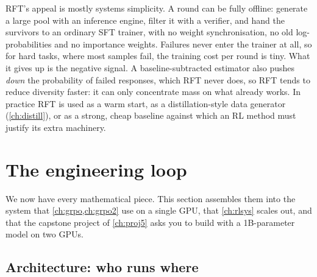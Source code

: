 RFT's appeal is mostly systems simplicity. A round can be fully offline: generate a large
pool with an inference engine, filter it with a verifier, and hand the survivors to an
ordinary SFT trainer, with no weight synchronisation, no old log-probabilities and no
importance weights. Failures never enter the trainer at all, so for hard tasks, where most
samples fail, the training cost per round is tiny. What it gives up is the negative signal.
A baseline-subtracted estimator also pushes \emph{down} the probability of failed responses,
which RFT never does, so RFT tends to reduce diversity faster: it can only concentrate mass on
what already works. In practice RFT is used as a warm start, as a distillation-style data
generator (\cref{ch:distill}), or as a strong, cheap baseline against which an RL method must
justify its extra machinery.

\section{The engineering loop}\label{sec:pg:loop}

We now have every mathematical piece. This section assembles them into the system that
\cref{ch:grpo,ch:grpo2} use on a single GPU, that \cref{ch:rlsys} scales out, and that the
capstone project of \cref{ch:proj5} asks you to build with a 1B-parameter model on two GPUs.

\subsection{Architecture: who runs where}

